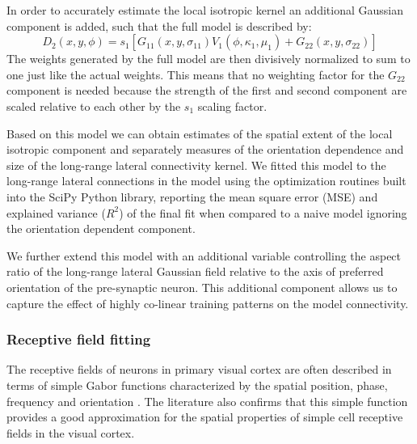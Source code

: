 In order to accurately estimate the local isotropic kernel an
additional Gaussian component is added, such that the full model is
described by:
\begin{equation}
D_2(x, y, \phi) = s_1 [G_{11}(x, y, \sigma_{11}) V_1(\phi, \kappa_1, \mu_1) + G_{22}(x, y, \sigma_{22})]
\end{equation}
The weights generated by the full model are then divisively normalized
to sum to one just like the actual weights. This means that no
weighting factor for the $G_{22}$ component is needed because the
strength of the first and second component are scaled relative to each
other by the $s_1$ scaling factor.

Based on this model we can obtain estimates of the spatial extent of
the local isotropic component and separately measures of the
orientation dependence and size of the long-range lateral connectivity
kernel. We fitted this model to the long-range lateral connections in
the model using the optimization routines built into the SciPy Python
library, reporting the mean square error (MSE) and explained variance
($R^2$) of the final fit when compared to a naive model ignoring the
orientation dependent component.

We further extend this model with an additional variable controlling
the aspect ratio of the long-range lateral Gaussian field relative to
the axis of preferred orientation of the pre-synaptic neuron. This
additional component allows us to capture the effect of highly
co-linear training patterns on the model connectivity.

\subsubsection*{Receptive field fitting} \label{rffitting}

The receptive fields of neurons in primary visual cortex are often
described in terms of simple Gabor functions characterized by the
spatial position, phase, frequency and orientation
\citep{Jones1987,Ringach2002b}. The literature also confirms that this
simple function provides a good approximation for the spatial
properties of simple cell receptive fields in the visual cortex.

